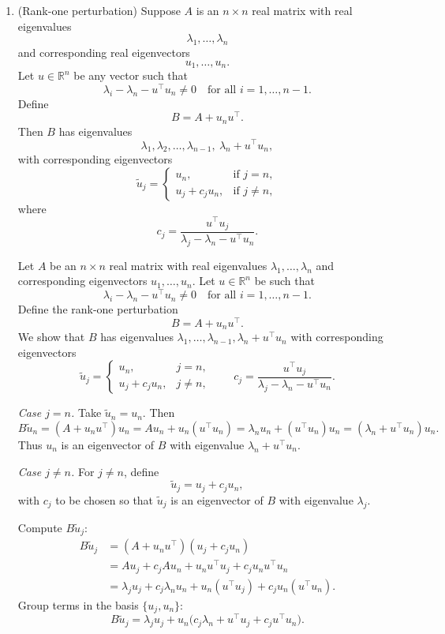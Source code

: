 \documentclass[answers,12pt,addpoints]{exam}
\begin{document}
\begin{enumerate}
\begin{solution}
\medskip
We have therefore decomposed $P$ as
\[
P = U + R,
\]
where $R$ is rank one, $U$ is upper triangular (since $U(i,j)=0$ for $j<i$), and the
diagonal entries of $U$ are
\[
U_{ii} = \sum_{j>i} p_j\left(1 - \frac{w_j}{w_i}\right), \qquad i=1,\dots,n,
\]
as required.
\end{solution}
\item (Rank-one perturbation) Suppose $A$ is an $n \times n$ real matrix with real eigenvalues
\[
\lambda_1, \ldots, \lambda_n
\]
and corresponding real eigenvectors
\[
u_1, \ldots, u_n.
\]
Let $u \in \mathbb{R}^n$ be any vector such that
\[
\lambda_i - \lambda_n - u^\top u_n \neq 0
\quad \text{for all } i = 1,\ldots, n-1.
\]
Define
\[
B = A + u_n u^\top.
\]
Then $B$ has eigenvalues
\[
\lambda_1, \lambda_2, \ldots, \lambda_{n-1},\ \lambda_n + u^\top u_n,
\]
with corresponding eigenvectors
\[
\tilde{u}_j =
\begin{cases}
u_n, & \text{if } j = n,\\[4pt]
u_j + c_j u_n, & \text{if } j \neq n,
\end{cases}
\]
where
\[
c_j = \frac{u^\top u_j}{\lambda_j - \lambda_n - u^\top u_n}.
\]
\begin{solution}
Let $A$ be an $n\times n$ real matrix with real eigenvalues
$\lambda_1,\dots,\lambda_n$ and corresponding eigenvectors
$u_1,\dots,u_n$. Let $u\in\mathbb{R}^n$ be such that
\[
\lambda_i - \lambda_n - u^\top u_n \neq 0 \quad \text{for all } i=1,\dots,n-1.
\]
Define the rank-one perturbation
\[
B = A + u_n u^\top.
\]
We show that $B$ has eigenvalues
$\lambda_1,\dots,\lambda_{n-1},\lambda_n + u^\top u_n$ with
corresponding eigenvectors
\[
\tilde u_j =
\begin{cases}
u_n, & j = n,\\[0.3em]
u_j + c_j u_n, & j \neq n,
\end{cases}
\qquad
c_j = \dfrac{u^\top u_j}{\lambda_j - \lambda_n - u^\top u_n}.
\]

\medskip\noindent
\emph{Case $j = n$.}
Take $\tilde u_n = u_n$. Then
\[
B \tilde u_n
= (A + u_n u^\top) u_n
= A u_n + u_n (u^\top u_n)
= \lambda_n u_n + (u^\top u_n) u_n
= (\lambda_n + u^\top u_n) u_n.
\]
Thus $u_n$ is an eigenvector of $B$ with eigenvalue
$\lambda_n + u^\top u_n$.

\medskip\noindent
\emph{Case $j \neq n$.}
For $j \neq n$, define
\[
\tilde u_j = u_j + c_j u_n,
\]
with $c_j$ to be chosen so that $\tilde u_j$ is an eigenvector of $B$
with eigenvalue $\lambda_j$.

Compute $B \tilde u_j$:
\begin{align*}
B \tilde u_j
&= (A + u_n u^\top)(u_j + c_j u_n) \\
&= A u_j + c_j A u_n + u_n u^\top u_j + c_j u_n u^\top u_n \\
&= \lambda_j u_j + c_j \lambda_n u_n
+ u_n (u^\top u_j) + c_j u_n (u^\top u_n).
\end{align*}
Group terms in the basis $\{u_j,u_n\}$:
\[
B \tilde u_j
= \lambda_j u_j
+ u_n\bigl(c_j \lambda_n + u^\top u_j + c_j u^\top u_n\bigr).
\]


\end{solution}
\end{enumerate}
\end{document}
